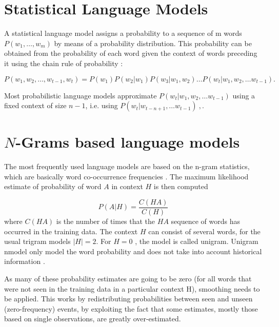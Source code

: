 \section{Statistical Language Models}
\label{sec:relwork-language-models}

A statistical language model assigns a probability to a sequence of m
words $P(w_1,\ldots,w_m)$ by means of a probability distribution. 
This probability can be obtained from the probability of
each word given the context of words preceding it using the chain rule of probability \cite{Bengio:2008}:

\begin{equation}
\label{eq:lm_probability}
 P(w_1, w_2, \ldots, w_{t-1},w_t) = P(w_1) P(w_2|w_1) P(w_3|w_1,w_2) \ldots 
  P(w_t | w_1, w_2, \ldots w_{t-1}).
\end{equation}

Most probabilistic language models  approximate $P(w_t | w_1, w_2, \ldots
w_{t-1})$ using a fixed context of size $n-1$, i.e. using  $P(w_t | w_{t-n+1}, \ldots w_{t-1})\ ,$.



\section{$N$-Grams based language models}
\label{sec:n-gram-lm}

The most frequently used language models are based on the n-gram statistics, which are basically word co-occurrence frequencies\cite{Manning:1999:FSN:311445} . The maximum likelihood estimate of probability of word $A$ in context $H$ is then computed


\begin{equation}
\label{eq:ngram-prob}
  P(A|H) = \frac{C(HA)}{C(H)}
\end{equation}
where $C(HA)$ is the number of times that the $HA$ sequence of words has occurred in the training data. The context $H$ can consist of several words, for the usual trigram models $|H| = 2$. For $H = 0$ , the model is called unigram. Unigram nmodel only model the word probability and does not take into account historical information \cite{Manning:1999:FSN:311445,mikolovphd2012}. 


As many of these probability estimates are going to be zero (for all words that were not seen in the training data in a particular context H), smoothing needs to be applied. This works by redistributing probabilities between seen and unseen (zero-frequency) events, by exploiting the fact that some estimates, mostly those based on single observations, are greatly over-estimated. 

